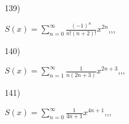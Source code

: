\documentclass[11pt, ukrainian]{article}
\begin{document}
\vspace{0.9cm}
139) \space 
{%
{$S(x)=\sum\limits_{n=0}^{\infty}{\frac{(-1)^n}{n!(n+2)!}}{x^{{2n}}}$},,, \par \smallskip  
}
\par
\vspace{0.9cm}
140) \space 
{%
{$S(x)=\sum\limits_{n=1}^{\infty}{\frac{1}{n(2n+3)}}{x^{{2n+3}}}$},,, \par \smallskip  
}
\par
\newpage
141) \space 
{%
{$S(x)=\sum\limits_{n=0}^{\infty}{\frac{1}{4n+1}}{x^{{4n+1}}}$},,, \par \smallskip  
}
\par
\vspace{0.9cm}
\end{document}
